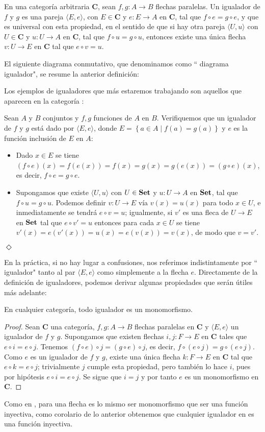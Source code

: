 \begin{Def}
   En una categoría arbitraria $\textbf{C}$, sean $f,g:A\to B$ flechas paralelas. Un igualador de $f$ y $g$ es una pareja $\langle E,e\rangle$, con $E\in\textbf{C}$ y $e:E\to A$ en $\textbf{C}$, tal que $f\circ e=g\circ e$, y que es universal con esta propiedad, en el sentido de que si hay otra pareja $\langle U,u\rangle$ con $U\in \textbf{C}$ y $u:U\to A$ en $\textbf{C}$, tal que $f\circ u=g\circ u$, entonces existe una única flecha $v:U\to E$ en $\textbf{C}$ tal que $e\circ v=u$. 
\end{Def}
El siguiente diagrama conmutativo, que denominamos como `` diagrama igualador", se resume la anterior definición:


Los ejemplos de igualadores que más estaremos trabajando son aquellos que aparecen en la categoría :
\begin{Ejm}
   Sean $A$ y $B$ conjuntos y $f,g$ funciones de $A$ en $B$. Verifiquemos que un igualador de $f$ y $g$ está dado por $\langle E,e\rangle$, donde $E=\left\lbrace a\in A\mid f(a)=g(a)\right\rbrace$ y $e$ es la función inclusión de $E$ en $A$:
   \begin{itemize}
      \item Dado $x\in E$ se tiene $(f\circ e)(x)=f(e(x))=f(x)=g(x)=g(e(x))=(g\circ e)(x)$, es decir, $f\circ e=g\circ e$.
      \item Supongamos que existe $\langle U,u\rangle$ con $U\in \normalfont{\textbf{Set}}$ y $u:U\to A$ en $\normalfont{\textbf{Set}}$, tal que $f\circ u=g\circ u$. Podemos definir $v:U\to E$ vía $v(x)=u(x)$ para todo $x\in U$, e inmediatamente se tendrá $e\circ v=u$; igualmente, si $v'$ es una fleca de $U\to E$ en $\normalfont{\textbf{Set}}$ tal que $e\circ v'=u$ entonces para cada $x\in U$ se tiene $v'(x)=e(v'(x))=u(x)=e(v(x))=v(x)$, de modo que $v=v'$.
   \end{itemize}
\hspace{\fill}$\Diamond$
\end{Ejm}
En la práctica, si no hay lugar a confusiones, nos referimos indistintamente por `` igualador" tanto al par $\langle E,e\rangle$ como simplemente a la flecha $e$. Directamente de la definición de igualadores, podemos derivar algunas propiedades que serán útiles más adelante:
\begin{Prop}
   En cualquier categoría, todo igualador es un monomorfismo.  
\end{Prop}
\begin{proof}
   Sean $\textbf{C}$ una categoría, $f,g:A\to B$ flechas paralelas en $\textbf{C}$ y $\langle E,e\rangle$ un igualador de $f$ y $g$. Supongamos que existen flechas $i,j:F\to E$ en $\textbf{C}$ tales que $e\circ i=e\circ j$. Tenemos $(f\circ e)\circ j=(g\circ e)\circ j$, es decir, $f\circ (e\circ j)=g\circ (e\circ j)$. Como $e$ es un igualador de $f$ y $g$, existe una única flecha $k:F\to E$ en $\textbf{C}$ tal que $e\circ k=e\circ j$; trivialmente $j$ cumple esta propiedad, pero también lo hace $i$, pues por hipótesis $e\circ i=e\circ j$. Se sigue que $i=j$ y por tanto $e$ es un monomorfismo en $\textbf{C}$.

\end{proof}
Como en , para una flecha es lo mismo ser monomorfismo que ser una función inyectiva, como corolario de lo anterior obtenemos que cualquier igualador en  es una función inyectiva.
